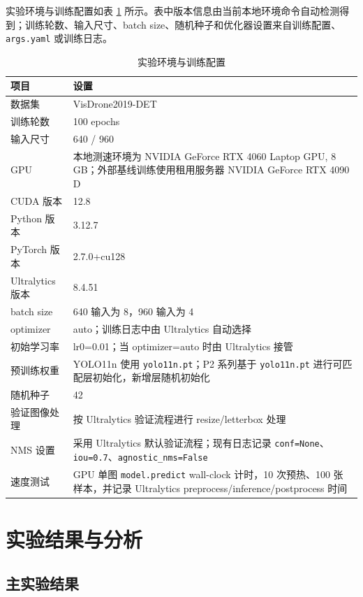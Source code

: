 \documentclass[UTF8,a4paper,10.5pt,fontset=windows]{ctexart}
\newcommand{\YOLOBase}{\mbox{YOLO11n}}
\begin{document}
实验环境与训练配置如表 \ref{tab:env} 所示。表中版本信息由当前本地环境命令自动检测得到；训练轮数、输入尺寸、batch size、随机种子和优化器设置来自训练配置、\texttt{args.yaml} 或训练日志。

\begin{table}[htbp]
\centering
\caption{实验环境与训练配置}
\label{tab:env}
\small
\begin{tabular}{p{}p{}}
\toprule
项目 & 设置 \\
\midrule
数据集 & VisDrone2019-DET \\
训练轮数 & 100 epochs \\
输入尺寸 & 640 / 960 \\
GPU & 本地测速环境为 NVIDIA GeForce RTX 4060 Laptop GPU, 8 GB；外部基线训练使用租用服务器 NVIDIA GeForce RTX 4090 D \\
CUDA 版本 & 12.8 \\
Python 版本 & 3.12.7 \\
PyTorch 版本 & 2.7.0+cu128 \\
Ultralytics 版本 & 8.4.51 \\
batch size & 640 输入为 8，960 输入为 4 \\
optimizer & auto；训练日志中由 Ultralytics 自动选择 \\
初始学习率 & lr0=0.01；当 optimizer=auto 时由 Ultralytics 接管 \\
预训练权重 & \YOLOBase{} 使用 \texttt{yolo11n.pt}；P2 系列基于 \texttt{yolo11n.pt} 进行可匹配层初始化，新增层随机初始化 \\
随机种子 & 42 \\
验证图像处理 & 按 Ultralytics 验证流程进行 resize/letterbox 处理 \\
NMS 设置 & 采用 Ultralytics 默认验证流程；现有日志记录 \texttt{conf=None}、\texttt{iou=0.7}、\texttt{agnostic\_nms=False} \\
速度测试 & GPU 单图 \texttt{model.predict} wall-clock 计时，10 次预热、100 张样本，并记录 Ultralytics preprocess/inference/postprocess 时间 \\
\bottomrule
\end{tabular}
\end{table}

\section{实验结果与分析}

\subsection{主实验结果}
\end{document}
